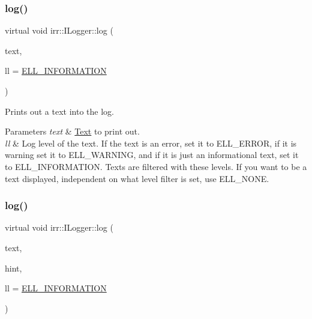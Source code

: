\subsubsection{\texorpdfstring{log()}{log()}\hspace{0.1cm}{\footnotesize\ttfamily [2/8]}}
{\footnotesize\ttfamily virtual void irr\+::\+I\+Logger\+::log (\begin{DoxyParamCaption}\item[{const \hyperlink{namespaceirr_a9395eaea339bcb546b319e9c96bf7410}{c8} $\ast$}]{text,  }\item[{\hyperlink{namespaceirr_aa2d1cac68606a25ed24cfffccfa30a92}{E\+L\+O\+G\+\_\+\+L\+E\+V\+EL}}]{ll = {\ttfamily \hyperlink{namespaceirr_aa2d1cac68606a25ed24cfffccfa30a92aaed3e0f449ad8851a1bb501d4df1c0e7}{E\+L\+L\+\_\+\+I\+N\+F\+O\+R\+M\+A\+T\+I\+ON}} }\end{DoxyParamCaption})\hspace{0.3cm}{\ttfamily [pure virtual]}}



Prints out a text into the log. 


\begin{DoxyParams}{Parameters}
{\em text} & \hyperlink{classText}{Text} to print out. \\
\hline
{\em ll} & Log level of the text. If the text is an error, set it to E\+L\+L\+\_\+\+E\+R\+R\+OR, if it is warning set it to E\+L\+L\+\_\+\+W\+A\+R\+N\+I\+NG, and if it is just an informational text, set it to E\+L\+L\+\_\+\+I\+N\+F\+O\+R\+M\+A\+T\+I\+ON. Texts are filtered with these levels. If you want to be a text displayed, independent on what level filter is set, use E\+L\+L\+\_\+\+N\+O\+NE. \\
\hline
\end{DoxyParams}
\mbox{\label{classirr_1_1ILogger_afccb7b2bb0a9b0415204d63e2b0cf290}} 
\subsubsection{\texorpdfstring{log()}{log()}\hspace{0.1cm}{\footnotesize\ttfamily [3/8]}}
{\footnotesize\ttfamily virtual void irr\+::\+I\+Logger\+::log (\begin{DoxyParamCaption}\item[{const \hyperlink{namespaceirr_a9395eaea339bcb546b319e9c96bf7410}{c8} $\ast$}]{text,  }\item[{const \hyperlink{namespaceirr_a9395eaea339bcb546b319e9c96bf7410}{c8} $\ast$}]{hint,  }\item[{\hyperlink{namespaceirr_aa2d1cac68606a25ed24cfffccfa30a92}{E\+L\+O\+G\+\_\+\+L\+E\+V\+EL}}]{ll = {\ttfamily \hyperlink{namespaceirr_aa2d1cac68606a25ed24cfffccfa30a92aaed3e0f449ad8851a1bb501d4df1c0e7}{E\+L\+L\+\_\+\+I\+N\+F\+O\+R\+M\+A\+T\+I\+ON}} }\end{DoxyParamCaption})\hspace{0.3cm}{\ttfamily [pure virtual]}}



